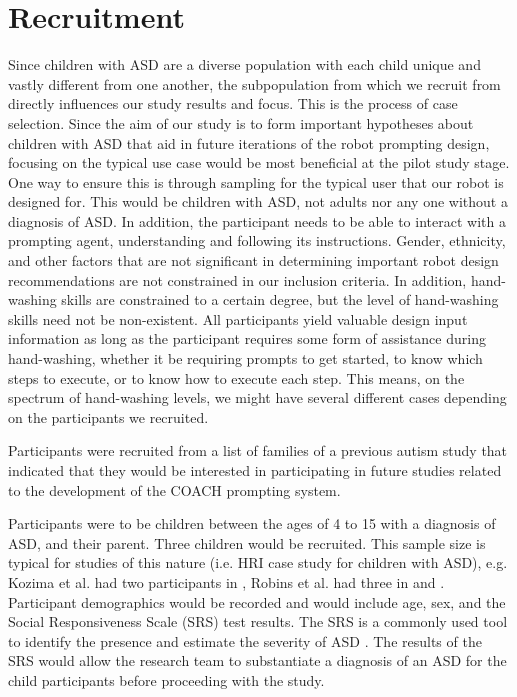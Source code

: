 \section{Recruitment}
\label{sec:Recruitment}
Since children with ASD are a diverse population with each child unique and vastly different from one another, the subpopulation from which we recruit from directly influences our study results and focus.  This is the process of case selection.  Since the aim of our study is to form important hypotheses about children with ASD that aid in future iterations of the robot prompting design, focusing on the typical use case would be most beneficial at the pilot study stage.  One way to ensure this is through sampling for the typical user that our robot is designed for.  This would be children with ASD, not adults nor any one without a diagnosis of ASD.  In addition, the participant needs to be able to interact with a prompting agent, understanding and following its instructions.  Gender, ethnicity, and other factors that are not significant in determining important robot design recommendations are not constrained in our inclusion criteria.  In addition, hand-washing skills are constrained to a certain degree, but the level of hand-washing skills need not be non-existent.  All participants yield valuable design input information as long as the participant requires some form of assistance during hand-washing, whether it be requiring prompts to get started, to know which steps to execute, or to know how to execute each step.  This means, on the spectrum of hand-washing levels, we might have several different cases depending on the participants we recruited.

Participants were recruited from a list of families of a previous autism study that indicated that they would be interested in participating in future studies related to the development of the COACH prompting system.

Participants were to be children between the ages of 4 to 15 with a diagnosis of ASD, and their parent. Three children would be recruited. This sample size is typical for studies of this nature (i.e. HRI case study for children with ASD), e.g. Kozima et al. had two participants in
\cite{kozima2005interactive}, Robins et al. had three in \cite{robins2004robot} and \cite{robins2009isolation}.  Participant demographics would be recorded and would include age, sex, and the Social Responsiveness Scale (SRS) test results.  The SRS is a commonly used tool to identify the presence and estimate the severity of ASD \cite{constantino2002social}. The results of the SRS would allow the research team to substantiate a diagnosis of an ASD for the child participants before proceeding with the study.

